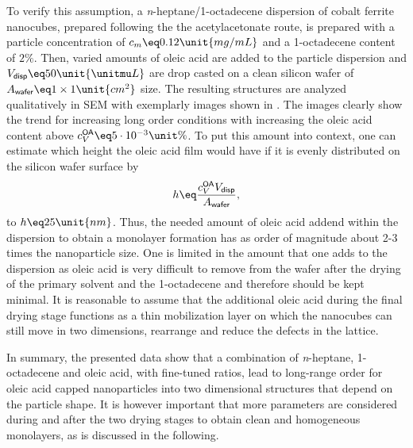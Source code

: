 \documentclass[\main/dresen_thesis.tex]{subfiles}
\begin{document}
    To verify this assumption, a \textit{n}-heptane/1-octadecene dispersion of cobalt ferrite nanocubes, prepared following the the acetylacetonate route, is prepared with a particle concentration of $c_m \eq 0.12 \unit{mg/mL}$ and a 1-octadecene content of $2\unit{\%}$.
    Then, varied amounts of oleic acid are added to the particle dispersion and $V_\textsf{disp} \eq 50 \unit{\unitmu L}$ are drop casted on a clean silicon wafer of $ A_\textsf{wafer} \eq 1 \times 1 \unit{cm^2}$ size.
    The resulting structures are analyzed qualitatively in SEM with exemplarly images shown in .
    The images clearly show the trend for increasing long order conditions with increasing the oleic acid content above $c_V^\textsf{OA} \eq 5\cdot10^{-3} \unit{\%}$.
    To put this amount into context, one can estimate which height the oleic acid film would have if it is evenly distributed on the silicon wafer surface by
    \begin{align}
      h \eq \frac{c_V^\textsf{OA} V_\textsf{disp}}{A_\textsf{wafer}}, \label{eq:monolayers:preparation:solventVariation:OAAddend}
    \end{align}
    to $h \eq 25 \unit{nm}$.
    Thus, the needed amount of oleic acid addend within the dispersion to obtain a monolayer formation has as order of magnitude about 2-3 times the nanoparticle size.
    One is limited in the amount that one adds to the dispersion as oleic acid is very difficult to remove from the wafer after the drying of the primary solvent and the 1-octadecene and therefore should be kept minimal.
    It is reasonable to assume that the additional oleic acid during the final drying stage functions as a thin mobilization layer on which the nanocubes can still move in two dimensions, rearrange and reduce the defects in the lattice.

    In summary, the presented data show that a combination of \textit{n}-heptane, 1-octadecene and oleic acid, with fine-tuned ratios, lead to long-range order for oleic acid capped nanoparticles into two dimensional structures that depend on the particle shape.
    It is however important that more parameters are considered during and after the two drying stages to obtain clean and homogeneous monolayers, as is discussed in the following.
\end{document}
